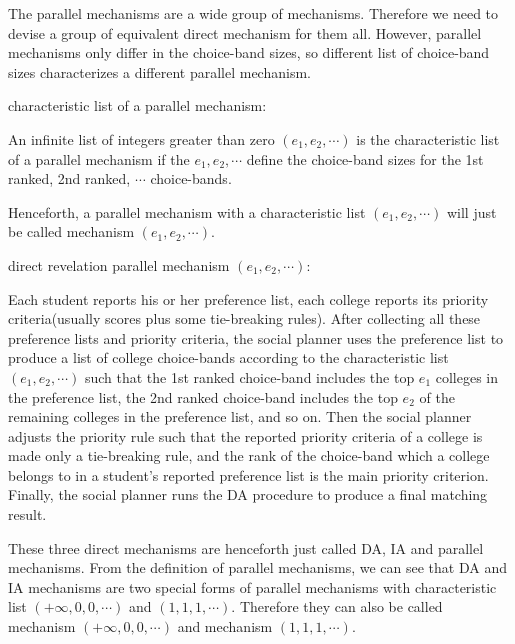 The parallel mechanisms are a wide group of mechanisms. Therefore we need to devise a group of equivalent direct mechanism for them all. However,
parallel mechanisms only differ in the choice-band sizes, so different list of choice-band sizes characterizes a different parallel mechanism.

\begin{definition*} characteristic list of a parallel mechanism:
  
  An infinite list of integers greater than zero $(e_1,e_2,\cdots)$ is the characteristic list of a parallel mechanism if the $e_1,e_2,\cdots$
  define the choice-band sizes for the 1st ranked, 2nd ranked, $\cdots$  choice-bands.
\end{definition*}

Henceforth, a parallel mechanism with a characteristic list $(e_1,e_2,\cdots)$ will just be called mechanism $(e_1,e_2,\cdots)$.


\begin{definition*}direct revelation parallel mechanism $(e_1,e_2,\cdots)$:

  Each student reports his or her preference list, each college reports its priority
  criteria(usually scores plus some tie-breaking rules). After
  collecting all these preference lists and priority criteria, the
  social planner uses the preference list to produce a list of college
  choice-bands according to the characteristic list $(e_1,e_2,\cdots)$
  such that the 1st ranked choice-band
  includes the top $e_1$ colleges in the preference list, the 2nd
  ranked choice-band includes the top $e_2$ of the remaining colleges in the preference list, and so on. Then the social planner adjusts the
  priority rule such that the reported priority criteria of a college
  is made only a tie-breaking rule, and the rank of the choice-band
  which a college belongs to in a student's reported preference list
  is the main priority criterion. Finally, the social planner runs the
  DA procedure to produce a final matching result.
\end{definition*}

These three direct mechanisms are henceforth just called DA, IA and parallel mechanisms.
From the definition of parallel mechanisms, we can see that DA and IA mechanisms are two special forms of parallel mechanisms with characteristic
list $(+\infty,0,0,\cdots)$ and $(1,1,1,\cdots)$. Therefore they can also be called mechanism $(+\infty,0,0,\cdots)$ and mechanism $(1,1,1,\cdots)$.





